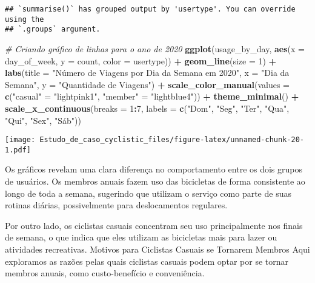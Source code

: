 \documentclass[
]{article}
\newenvironment{Shaded}{\begin{snugshade}}{\end{snugshade}}
\newcommand{\AttributeTok}[1]{\textcolor[rgb]{0.13,0.29,0.53}{#1}}
\newcommand{\CommentTok}[1]{\textcolor[rgb]{0.56,0.35,0.01}{\textit{#1}}}
\newcommand{\DecValTok}[1]{\textcolor[rgb]{0.00,0.00,0.81}{#1}}
\newcommand{\FunctionTok}[1]{\textcolor[rgb]{0.13,0.29,0.53}{\textbf{#1}}}
\newcommand{\NormalTok}[1]{#1}
\newcommand{\OtherTok}[1]{\textcolor[rgb]{0.56,0.35,0.01}{#1}}
\newcommand{\SpecialCharTok}[1]{\textcolor[rgb]{0.81,0.36,0.00}{\textbf{#1}}}
\newcommand{\StringTok}[1]{\textcolor[rgb]{0.31,0.60,0.02}{#1}}
\begin{document}
\begin{verbatim}
## `summarise()` has grouped output by 'usertype'. You can override using the
## `.groups` argument.
\end{verbatim}

\begin{Shaded}
\begin{Highlighting}[]
\CommentTok{\# Criando gráfico de linhas para o ano de 2020}
\FunctionTok{ggplot}\NormalTok{(usage\_by\_day, }\FunctionTok{aes}\NormalTok{(}\AttributeTok{x =}\NormalTok{ day\_of\_week, }\AttributeTok{y =}\NormalTok{ count, }\AttributeTok{color =}\NormalTok{ usertype)) }\SpecialCharTok{+}
  \FunctionTok{geom\_line}\NormalTok{(}\AttributeTok{size =} \DecValTok{1}\NormalTok{) }\SpecialCharTok{+}
  \FunctionTok{labs}\NormalTok{(}\AttributeTok{title =} \StringTok{"Número de Viagens por Dia da Semana em 2020"}\NormalTok{, }\AttributeTok{x =} \StringTok{"Dia da Semana"}\NormalTok{, }\AttributeTok{y =} \StringTok{"Quantidade de Viagens"}\NormalTok{) }\SpecialCharTok{+}
  \FunctionTok{scale\_color\_manual}\NormalTok{(}\AttributeTok{values =} \FunctionTok{c}\NormalTok{(}\StringTok{"casual"} \OtherTok{=} \StringTok{"lightpink1"}\NormalTok{, }\StringTok{"member"} \OtherTok{=} \StringTok{"lightblue4"}\NormalTok{)) }\SpecialCharTok{+}
  \FunctionTok{theme\_minimal}\NormalTok{() }\SpecialCharTok{+}
  \FunctionTok{scale\_x\_continuous}\NormalTok{(}\AttributeTok{breaks =} \DecValTok{1}\SpecialCharTok{:}\DecValTok{7}\NormalTok{, }\AttributeTok{labels =} \FunctionTok{c}\NormalTok{(}\StringTok{"Dom"}\NormalTok{, }\StringTok{"Seg"}\NormalTok{, }\StringTok{"Ter"}\NormalTok{, }\StringTok{"Qua"}\NormalTok{, }\StringTok{"Qui"}\NormalTok{, }\StringTok{"Sex"}\NormalTok{, }\StringTok{"Sáb"}\NormalTok{))}
\end{Highlighting}
\end{Shaded}

\texttt{[image: Estudo\_de\_caso\_cyclistic\_files/figure-latex/unnamed-chunk-20-1.pdf]}

Os gráficos revelam uma clara diferença no comportamento entre os dois
grupos de usuários. Os membros anuais fazem uso das bicicletas de forma
consistente ao longo de toda a semana, sugerindo que utilizam o serviço
como parte de suas rotinas diárias, possivelmente para deslocamentos
regulares.

Por outro lado, os ciclistas casuais concentram seu uso principalmente
nos finais de semana, o que indica que eles utilizam as bicicletas mais
para lazer ou atividades recreativas. Motivos para Ciclistas Casuais se
Tornarem Membros Aqui exploramos as razões pelas quais ciclistas casuais
podem optar por se tornar membros anuais, como custo-benefício e
conveniência.
\end{document}
